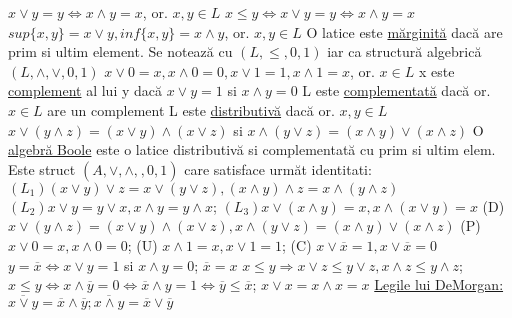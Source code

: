 \documentclass[8pt,twocolumn]{extarticle}
\begin{document}
	$x \vee y = y \Leftrightarrow x \wedge y = x$, or. $x, y \in L$ \newline
	$x \leq y \Leftrightarrow x \vee y = y \Leftrightarrow x \wedge y = x$ \newline
	$sup\{ x, y \} = x \vee y, inf\{ x, y \} = x \wedge y$, or. $x, y \in L$ \newline
	O latice este \underline{mărginită} dacă are prim si ultim element. Se notează cu $(L, \leq, 0, 1)$ iar ca structură algebrică $(L, \wedge, \vee, 0, 1)$ \newline
	$x \vee 0 = x, x \wedge 0 = 0, x \vee 1 = 1, x \wedge 1 = x$, or. $x \in L$ \newline
	x este \underline{complement} al lui y dacă $x \vee y = 1$ si $x \wedge y = 0$ \newline
	L este \underline{complementată} dacă or. $x \in L$ are un complement \newline
	L este \underline{distributivă} dacă or. $x, y \in L$ \newline
	$x \vee (y \wedge z) = (x \vee y) \wedge (x \vee z)$ si $x \wedge (y \vee z) = (x \wedge y) \vee (x \wedge z)$ \newline
	O \underline{algebră Boole} este o latice distributivă si complementată cu prim si ultim elem. Este struct $(A, \vee, \wedge, _{ }, 0, 1)$ care satisface următ identitati: \newline
	$(L_{1}) (x \vee y) \vee z = x \vee (y \vee z), (x \wedge y) \wedge z = x \wedge (y \wedge z)$ \newline
	$(L_{2}) x \vee y = y \vee x, x \wedge y = y \wedge x$; $(L_{3}) x \vee (x \wedge y) = x, x \wedge (x \vee y) = x$ \newline
	(D) $x \vee (y \wedge z) = (x \vee y) \wedge (x \vee z), x \wedge (y \vee z) = (x \wedge y) \vee (x \wedge z)$ \newline
	(P) $x \vee 0 = x, x \wedge 0 = 0$; (U) $x \wedge 1 = x, x \vee 1 = 1$; (C) $x \vee \overline{x} = 1, x \vee \overline{x} = 0$ \newline
	$y = \overline{x} \Leftrightarrow x \vee y = 1$ si $x \wedge y = 0$; $\overline{x} = x$ \newline
	$x \leq y \Rightarrow x \vee z \leq y \vee z, x \wedge z \leq y \wedge z$; $x \leq y \Leftrightarrow x \wedge \overline{y} = 0 \Leftrightarrow \overline{x} \wedge y = 1 \Leftrightarrow \overline{y} \leq \overline{x}$; \newline
	$x \vee x = x \wedge x = x$ \newline
	\noindent \underline{Legile lui DeMorgan:} $\overline{x \vee y} = \overline{x} \wedge \overline{y}; \overline{x \wedge y} = \overline{x} \vee \overline{y}$ \newline
\end{document}
